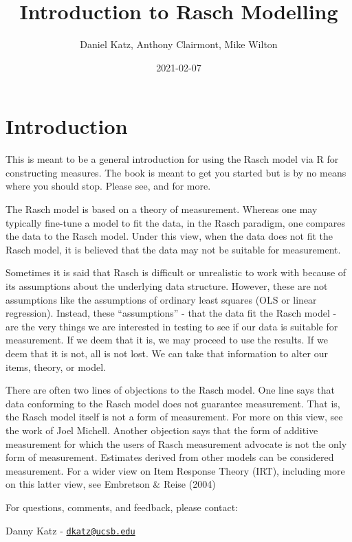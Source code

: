 \documentclass[
]{book}
\title{Introduction to Rasch Modelling}
\author{Daniel Katz, Anthony Clairmont, Mike Wilton}
\date{2021-02-07}
\begin{document}
\maketitle

{
\setcounter{tocdepth}{1}
\tableofcontents
}
\hypertarget{introduction}{%
\chapter{Introduction}\label{introduction}}

This is meant to be a general introduction for using the Rasch model via R for constructing measures. The book is meant to get you started but is by no means where you should stop. Please see, \citet{WilsonMark2005} and \citet{BondTrevor} for more.

The Rasch model is based on a theory of measurement. Whereas one may typically fine-tune a model to fit the data, in the Rasch paradigm, one compares the data to the Rasch model. Under this view, when the data does not fit the Rasch model, it is believed that the data may not be suitable for measurement.

Sometimes it is said that Rasch is difficult or unrealistic to work with because of its assumptions about the underlying data structure. However, these are not assumptions like the assumptions of ordinary least squares (OLS or linear regression). Instead, these ``assumptions'' - that the data fit the Rasch model - are the very things we are interested in testing to see if our data is suitable for measurement. If we deem that it is, we may proceed to use the results. If we deem that it is not, all is not lost. We can take that information to alter our items, theory, or model.

There are often two lines of objections to the Rasch model. One line says that data conforming to the Rasch model does not guarantee measurement. That is, the Rasch model itself is not a form of measurement. For more on this view, see the work of Joel Michell. Another objection says that the form of additive measurement for which the users of Rasch measurement advocate is not the only form of measurement. Estimates derived from other models can be considered measurement. For a wider view on Item Response Theory (IRT), including more on this latter view, see Embretson \& Reise (2004)

For questions, comments, and feedback, please contact:

Danny Katz -
\href{mailto:dkatz@ucsb.edu}{\nolinkurl{dkatz@ucsb.edu}}
\end{document}
